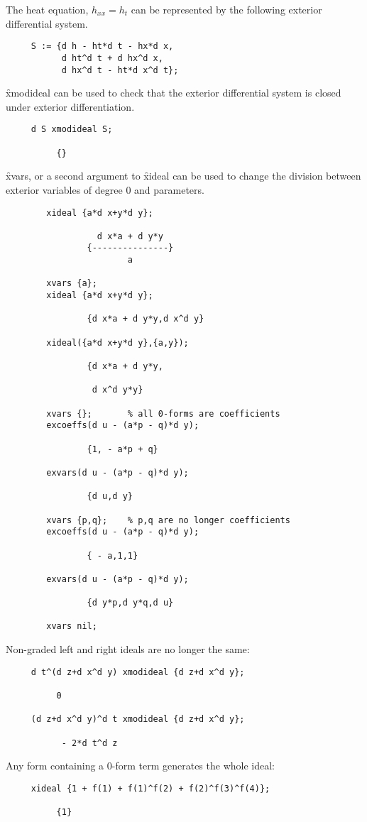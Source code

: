 The heat equation, $h_{xx}=h_t$ can be represented by the following
exterior differential system. 
\begin{verbatim}
     S := {d h - ht*d t - hx*d x,
           d ht^d t + d hx^d x,
           d hx^d t - ht*d x^d t};
\end{verbatim}
\f{xmodideal} can be used to check that the exterior differential system is
closed under exterior differentiation.
\begin{verbatim}
     d S xmodideal S;

          {}
\end{verbatim}

\f{xvars}, or a second argument to \f{xideal} can be used to change the
division between exterior variables of degree 0 and parameters.
\begin{verbatim}
        xideal {a*d x+y*d y};

                  d x*a + d y*y
                {---------------}
                        a

        xvars {a};
        xideal {a*d x+y*d y};
 
                {d x*a + d y*y,d x^d y}
 
        xideal({a*d x+y*d y},{a,y});
 
                {d x*a + d y*y,
 
                 d x^d y*y}
 
        xvars {};       % all 0-forms are coefficients
        excoeffs(d u - (a*p - q)*d y);
        
                {1, - a*p + q}
        
        exvars(d u - (a*p - q)*d y);

                {d u,d y}

        xvars {p,q};    % p,q are no longer coefficients
        excoeffs(d u - (a*p - q)*d y);
        
                { - a,1,1}

        exvars(d u - (a*p - q)*d y);

                {d y*p,d y*q,d u}

        xvars nil;
\end{verbatim}


Non-graded left and right ideals are no longer the same:
\begin{verbatim}
     d t^(d z+d x^d y) xmodideal {d z+d x^d y};

          0

     (d z+d x^d y)^d t xmodideal {d z+d x^d y};

           - 2*d t^d z
\end{verbatim}
Any form containing a 0-form term generates the whole ideal:
\begin{verbatim}
     xideal {1 + f(1) + f(1)^f(2) + f(2)^f(3)^f(4)};

          {1}
\end{verbatim}


